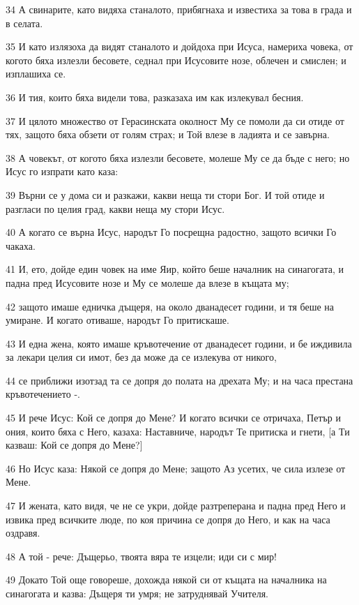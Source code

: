 \par 34 А свинарите, като видяха станалото, прибягнаха и известиха за това в града и в селата.
\par 35 И като излязоха да видят станалото и дойдоха при Исуса, намериха човека, от когото бяха излезли бесовете, седнал при Исусовите нозе, облечен и смислен; и изплашиха се.
\par 36 И тия, които бяха видели това, разказаха им как излекувал бесния.
\par 37 И цялото множество от Герасинската околност Му се помоли да си отиде от тях, защото бяха обзети от голям страх; и Той влезе в ладията и се завърна.
\par 38 А човекът, от когото бяха излезли бесовете, молеше Му се да бъде с него; но Исус го изпрати като каза:
\par 39 Върни се у дома си и разкажи, какви неща ти стори Бог. И той отиде и разгласи по целия град, какви неща му стори Исус.
\par 40 А когато се върна Исус, народът Го посрещна радостно, защото всички Го чакаха.
\par 41 И, ето, дойде един човек на име Яир, който беше началник на синагогата, и падна пред Исусовите нозе и Му се молеше да влезе в къщата му;
\par 42 защото имаше едничка дъщеря, на около дванадесет години, и тя беше на умиране. И когато отиваше, народът Го притискаше.
\par 43 И една жена, която имаше кръвотечение от дванадесет години, и бе иждивила за лекари целия си имот, без да може да се излекува от никого,
\par 44 се приближи изотзад та се допря до полата на дрехата Му; и на часа престана кръвотечението -.
\par 45 И рече Исус: Кой се допря до Мене? И когато всички се отричаха, Петър и ония, които бяха с Него, казаха: Наставниче, народът Те притиска и гнети, [а Ти казваш: Кой се допря до Мене?]
\par 46 Но Исус каза: Някой се допря до Мене; защото Аз усетих, че сила излезе от Мене.
\par 47 И жената, като видя, че не се укри, дойде разтреперана и падна пред Него и извика пред всичките люде, по коя причина се допря до Него, и как на часа оздравя.
\par 48 А той - рече: Дъщерьо, твоята вяра те изцели; иди си с мир!
\par 49 Докато Той още говореше, дохожда някой си от къщата на началника на синагогата и казва: Дъщеря ти умря; не затруднявай Учителя.
